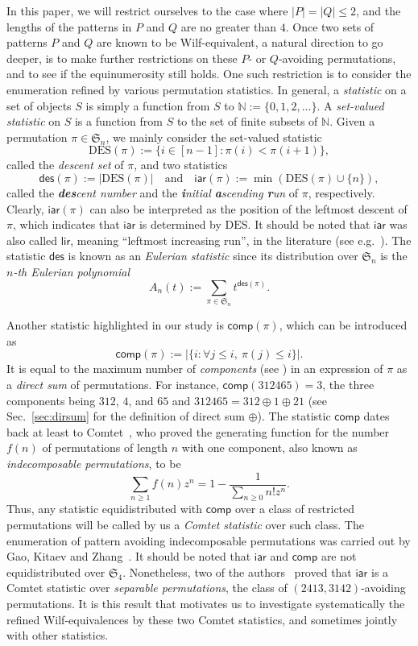 \documentclass[12pt]{amsart}
\numberwithin{equation}{section}
\theoremstyle{plain}
\theoremstyle{definition}
\newcommand{\N}{\mathbb{N}}
\def\des{\mathsf{des}}
\def\S{\mathfrak{S}}
\def\iar{\mathsf{iar}}
\def\lir{\mathsf{lir}}
\def\comp{\mathsf{comp}}
\def\DES{\mathrm{DES}}
\begin{document}
In this paper, we will restrict ourselves to the case where $|P|=|Q|\le 2$, and the lengths of the patterns in $P$ and $Q$ are no greater than $4$. Once two sets of patterns $P$ and $Q$ are known to be Wilf-equivalent, a natural direction to go deeper, is to make further restrictions on these $P$- or $Q$-avoiding permutations, and to see if the equinumerosity still holds. One such restriction is to consider the enumeration refined by various permutation statistics. In general, a {\em statistic} on a set of objects $S$ is simply a function from $S$ to $\N:=\{0,1,2,\ldots\}$. A {\em set-valued statistic} on $S$ is a function from $S$ to the set of finite subsets of $\N$. Given a permutation $\pi\in\S_n$, we mainly consider the set-valued statistic
$$\DES(\pi):=\{i\in[n-1]:\pi(i)<\pi(i+1)\},$$
called the {\em descent set} of $\pi$, and two statistics
$$\des(\pi):=|\DES(\pi)|\quad \text{and}\quad \iar(\pi):=\min(\DES(\pi)\cup\{n\}),$$
called the {\em {\bf\em des}cent number} and the {\em {\bf\em i}nitial {\bf\em a}scending {\bf\em r}un} of $\pi$, respectively. Clearly, $\iar(\pi)$ can also be interpreted as the position of the leftmost descent of $\pi$, which indicates that $\iar$ is determined by $\DES$. It should be noted that $\iar$ was also called $\lir$, meaning ``leftmost increasing run'', in the literature (see e.g.~\cite{CK}). The statistic $\des$ is  known as an {\em Eulerian statistic} since its distribution over $\S_n$ is the {\em$n$-th  Eulerian polynomial} 
$$
A_n(t):=\sum_{\pi\in\S_n}t^{\des(\pi)}.
$$ 

Another statistic highlighted in our study is $\comp(\pi)$, which can be introduced as
$$
\comp(\pi):=|\{i: \forall j\leq i,\: \pi(j)\leq i\}|. 
$$
It is equal to the maximum number of {\em components} (see \cite{adin,CK,CKS}) in an expression of $\pi$ as a {\em direct sum} of permutations. For instance, $\comp(312465)=3$, the three components being $312$, $4$, and $65$ and $312465=312\oplus1\oplus 21$ (see Sec.~\ref{sec:dirsum} for the definition of direct sum $\oplus$).
The statistic  $\comp$ dates back at least to Comtet~\cite[3, Ex.~VI.14]{com}, who proved the generating function for the number $f(n)$ of permutations of length $n$ with one component, also known as {\em indecomposable permutations}, to be 
$$
\sum_{n\geq1}f(n)z^n=1-\frac{1}{\sum_{n\geq0}n!z^n}. 
$$
Thus, any statistic equidistributed with $\comp$ over a class of restricted permutations will be called by us a {\em Comtet statistic} over such class.  The enumeration of pattern avoiding indecomposable permutations was  carried out by Gao, Kitaev and Zhang~\cite{GKZ}. It should be noted that $\iar$ and $\comp$ are not equidistributed over $\S_4$. Nonetheless, two of the authors~\cite{FW} proved  that $\iar$ is a Comtet statistic over {\em separable permutations}, the class of $(2413,3142)$-avoiding permutations. It is this result that motivates us to investigate systematically  the refined Wilf-equivalences by these two Comtet statistics, and sometimes jointly with other statistics. 
\end{document}
